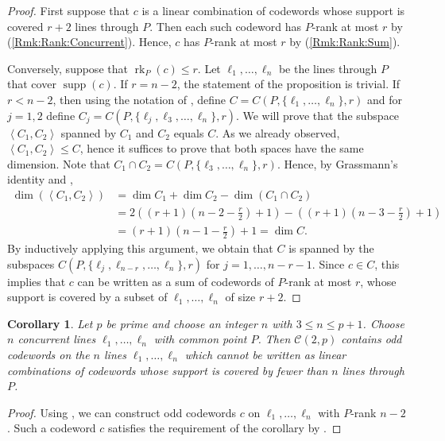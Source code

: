 \documentclass[12pt, a4paper]{article}
\newtheorem{crl}[thm]{Corollary}
\theoremstyle{definition}
\newcommand{\vspan}[1]{\left \langle #1 \right \rangle}
\newcommand{\mc}{\mathcal C}
\DeclareMathOperator{\supp}{supp}
\DeclareMathOperator{\rk}{rk}
\begin{document}
\begin{proof}
 First suppose that $c$ is a linear combination of codewords whose support is covered $r+2$ lines through $P$.
 Then each such codeword has $P$-rank at most $r$ by  (\ref{Rmk:Rank:Concurrent}).
 Hence, $c$ has $P$-rank at most $r$ by  (\ref{Rmk:Rank:Sum}).

 Conversely, suppose that $\rk_P(c) \leq r$.
 Let $\ell_1, \dots, \ell_n$ be the lines through $P$ that cover $\supp(c)$.
 If $r=n-2$, the statement of the proposition is trivial.
 If $r<n-2$, then using the notation of , define $C = C(P,\{\ell_1,\dots,\ell_n\},r)$ and for $j=1,2$ define $C_j = C(P,\{\ell_j,\ell_3,\dots,\ell_n\},r)$.
 We will prove that the subspace $\vspan{C_1,C_2}$ spanned by $C_1$ and $C_2$ equals $C$.
 As we already observed, $\vspan{C_1,C_2} \leq C$, hence it suffices to prove that both spaces have the same dimension.
 Note that $C_1 \cap C_2 = C(P,\{\ell_3,\dots,\ell_n\},r)$.
 Hence, by Grassmann's identity and ,
 \begin{align*}
  \dim(\vspan{C_1,C_2}) 
   &= \dim C_1 + \dim C_2 - \dim(C_1 \cap C_2) \\
   &= 2\left( (r+1)\left(n-2-\frac r2\right) + 1 \right) - \left( (r+1)\left(n-3-\frac r2\right) + 1 \right) \\
   &= (r+1)\left(n-1-\frac r2\right) + 1 = \dim C.
 \end{align*}
 By inductively applying this argument, we obtain that $C$ is spanned by the subspaces $C(P,\{\ell_j,\ell_{n-r},\dots,\ell_n\},r)$ for $j=1,\dots,n-r-1$.
 Since $c \in C$, this implies that $c$ can be written as a sum of codewords of $P$-rank at most $r$, whose support is covered by a subset of $\ell_1, \dots, \ell_n$ of size $r+2$.
\end{proof}

\begin{crl}
\label{odd codewords of maximal rank}
 Let $p$ be prime and choose an integer $n$ with $3 \leq n \leq p+1$.
 Choose $n$ concurrent lines $\ell_1, \dots, \ell_n$ with common point $P$.
 Then $\mc(2,p)$ contains odd codewords on the $n$ lines $\ell_1, \dots, \ell_n$ which cannot be written as linear combinations of codewords whose support is covered by fewer than $n$ lines through $P$.
\end{crl}

\begin{proof}
 Using , we can construct odd codewords $c$ on $\ell_1, \dots, \ell_n$ with $P$-rank $n-2$.
 Such a codeword $c$ satisfies the requirement of the corollary by .
\end{proof}
\end{document}
